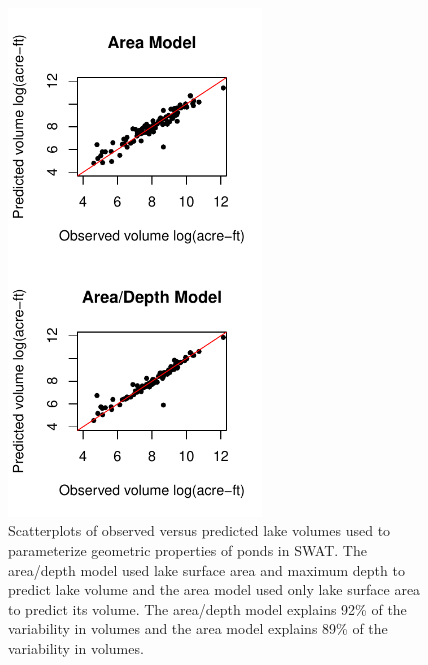 \begin{figure}[H]
	\centering
	\includegraphics[width=0.6\textwidth]{./img/area_model_observed_predicted.pdf}
	\caption[Scatterplots of observed versus predicted lake volumes]{Scatterplots of observed versus predicted lake volumes used to parameterize geometric properties of ponds in SWAT. The area/depth model used lake surface area and maximum depth to predict lake volume and the area model used only lake surface area to predict its volume. The area/depth model explains 92\% of the variability in volumes and the area model explains 89\% of the variability in volumes.}
	\label{fig:volume_regressions}
\end{figure}

